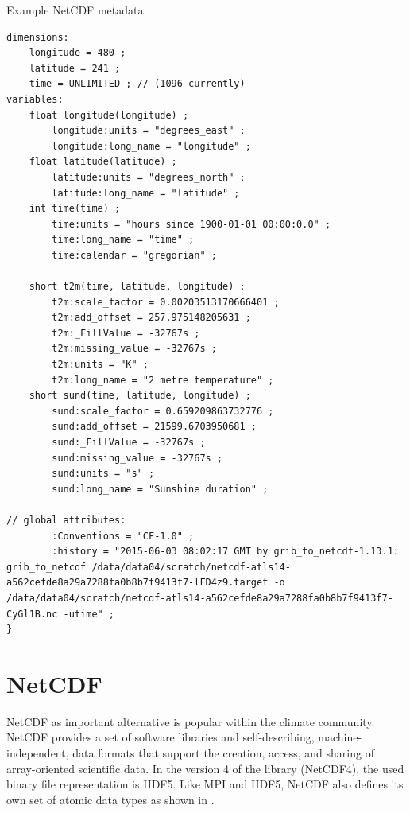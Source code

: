 \begin{tcbcode}[label={lst:NetCDF-data}]{Example NetCDF metadata}
\begin{lstlisting}[upquote=true]
dimensions:
	longitude = 480 ;
	latitude = 241 ;
	time = UNLIMITED ; // (1096 currently)
variables:
	float longitude(longitude) ;
		longitude:units = "degrees_east" ;
		longitude:long_name = "longitude" ;
	float latitude(latitude) ;
		latitude:units = "degrees_north" ;
		latitude:long_name = "latitude" ;
	int time(time) ;
		time:units = "hours since 1900-01-01 00:00:0.0" ;
		time:long_name = "time" ;
		time:calendar = "gregorian" ;

	short t2m(time, latitude, longitude) ;
		t2m:scale_factor = 0.00203513170666401 ;
		t2m:add_offset = 257.975148205631 ;
		t2m:_FillValue = -32767s ;
		t2m:missing_value = -32767s ;
		t2m:units = "K" ;
		t2m:long_name = "2 metre temperature" ;
	short sund(time, latitude, longitude) ;
		sund:scale_factor = 0.659209863732776 ;
		sund:add_offset = 21599.6703950681 ;
		sund:_FillValue = -32767s ;
		sund:missing_value = -32767s ;
		sund:units = "s" ;
		sund:long_name = "Sunshine duration" ;

// global attributes:
		:Conventions = "CF-1.0" ;
		:history = "2015-06-03 08:02:17 GMT by grib_to_netcdf-1.13.1: grib_to_netcdf /data/data04/scratch/netcdf-atls14-a562cefde8a29a7288fa0b8b7f9413f7-lFD4z9.target -o /data/data04/scratch/netcdf-atls14-a562cefde8a29a7288fa0b8b7f9413f7-CyGl1B.nc -utime" ;
}
\end{lstlisting}
\end{tcbcode}

\chapter{NetCDF}

NetCDF as important alternative is popular within the climate community. NetCDF provides a set of software libraries and self-describing, machine-independent, data formats that support the creation, access, and sharing of array-oriented scientific data.
In the version 4 of the library (NetCDF4), the used binary file representation is HDF5. Like MPI and HDF5, NetCDF also defines its own set of atomic data types as shown in .

